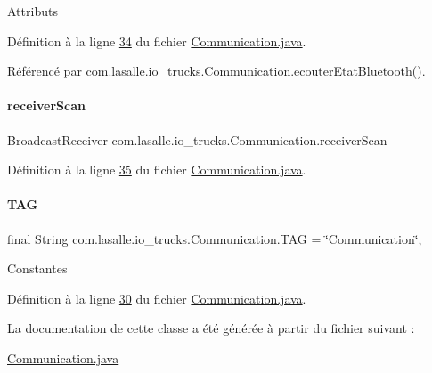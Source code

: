 Attributs 

Définition à la ligne \hyperlink{_communication_8java_source_l00034}{34} du fichier \hyperlink{_communication_8java_source}{Communication.\+java}.



Référencé par \hyperlink{_communication_8java_source_l00068}{com.\+lasalle.\+io\+\_\+trucks.\+Communication.\+ecouter\+Etat\+Bluetooth()}.

\mbox{\label{classcom_1_1lasalle_1_1io__trucks_1_1_communication_aa226d389c696b51929ee0b62cfd04710}} 
\paragraph{\texorpdfstring{receiver\+Scan}{receiverScan}}
{\footnotesize\ttfamily Broadcast\+Receiver com.\+lasalle.\+io\+\_\+trucks.\+Communication.\+receiver\+Scan\hspace{0.3cm}{\ttfamily [private]}}



Définition à la ligne \hyperlink{_communication_8java_source_l00035}{35} du fichier \hyperlink{_communication_8java_source}{Communication.\+java}.

\mbox{\label{classcom_1_1lasalle_1_1io__trucks_1_1_communication_aec1062036f071d51a4925a3080d71004}} 
\paragraph{\texorpdfstring{T\+AG}{TAG}}
{\footnotesize\ttfamily final String com.\+lasalle.\+io\+\_\+trucks.\+Communication.\+T\+AG = \char`\"{}Communication\char`\"{}\hspace{0.3cm}{\ttfamily [static]}, {\ttfamily [private]}}

Constantes 

Définition à la ligne \hyperlink{_communication_8java_source_l00030}{30} du fichier \hyperlink{_communication_8java_source}{Communication.\+java}.



La documentation de cette classe a été générée à partir du fichier suivant \+:\begin{DoxyCompactItemize}
\item 
\hyperlink{_communication_8java}{Communication.\+java}\end{DoxyCompactItemize}
